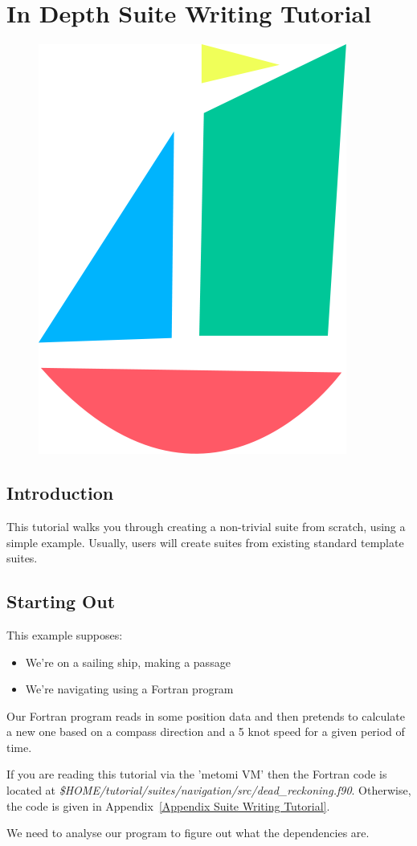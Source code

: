 
\section{In Depth Suite Writing Tutorial}
\label{In Depth Suite Writing Tutorial}

\begin{figure}[htp]
\includegraphics[width=0.3\columnwidth]{resources/suite-writing.png}
\end{figure}

\subsection{Introduction}

This tutorial walks you through creating a non-trivial suite from scratch, using a simple example. Usually, users will create suites from existing standard template suites.

\subsection{Starting Out}

This example supposes:
\begin{itemize}
    \item We're on a sailing ship, making a passage
    \item We're navigating using a Fortran program
\end{itemize}

Our Fortran program reads in some position data and then pretends to calculate a new one based on a compass direction and a 5 knot speed for a given period of time.

If you are reading this tutorial via the 'metomi VM' then the Fortran code is located at {\em \$HOME/tutorial/suites/navigation/src/dead\_reckoning.f90}. Otherwise, the code is given in Appendix~\ref{Appendix Suite Writing Tutorial}.

We need to analyse our program to figure out what the dependencies are.

